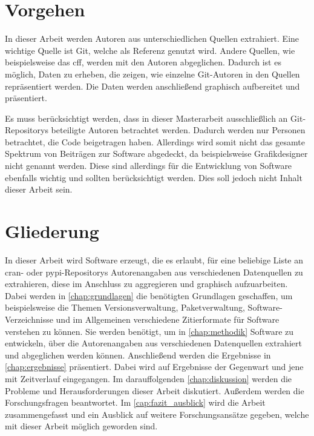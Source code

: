 \section{Vorgehen}
\label{sec:vorgehen}
In dieser Arbeit werden Autoren aus unterschiedlichen Quellen extrahiert.
Eine wichtige Quelle ist Git, welche als Referenz genutzt wird.
Andere Quellen, wie beispielsweise das \gls{cff}, werden mit den Autoren abgeglichen.
Dadurch ist es möglich, Daten zu erheben, die zeigen, wie einzelne Git-Autoren in den Quellen repräsentiert werden.
Die Daten werden anschließend graphisch aufbereitet und präsentiert.

Es muss berücksichtigt werden, dass in dieser Masterarbeit ausschließlich an Git-Repositorys beteiligte Autoren betrachtet werden.
Dadurch werden nur Personen betrachtet, die Code beigetragen haben.
Allerdings wird somit nicht das gesamte Spektrum von Beiträgen zur Software abgedeckt, da beispielsweise Grafikdesigner nicht genannt werden.
Diese sind allerdings für die Entwicklung von Software ebenfalls wichtig und sollten berücksichtigt werden.
Dies soll jedoch nicht Inhalt dieser Arbeit sein.

\section{Gliederung}
\label{sec:gliederung}
In dieser Arbeit wird Software erzeugt, die es erlaubt, für eine beliebige Liste an \gls{cran}- oder \gls{pypi}-Repositorys Autorenangaben aus verschiedenen Datenquellen zu extrahieren, diese im Anschluss zu aggregieren und graphisch aufzuarbeiten.
Dabei werden in \autoref{chap:grundlagen} die benötigten Grundlagen geschaffen, um beispielsweise die Themen Versionsverwaltung, Paketverwaltung, Software-Verzeichnisse und im Allgemeinen verschiedene Zitierformate für Software verstehen zu können.
Sie werden benötigt, um in \autoref{chap:methodik} Software zu entwickeln, über die Autorenangaben aus verschiedenen Datenquellen extrahiert und abgeglichen werden können.
Anschließend werden die Ergebnisse in \autoref{chap:ergebnisse} präsentiert.
Dabei wird auf Ergebnisse der Gegenwart und jene mit Zeitverlauf eingegangen.
Im darauffolgenden \autoref{chap:diskussion} werden die Probleme und Herausforderungen dieser Arbeit diskutiert.
Außerdem werden die Forschungsfragen beantwortet.
Im \autoref{cap:fazit_ausblick} wird die Arbeit zusammengefasst und ein Ausblick auf weitere Forschungsansätze gegeben, welche mit dieser Arbeit möglich geworden sind.
